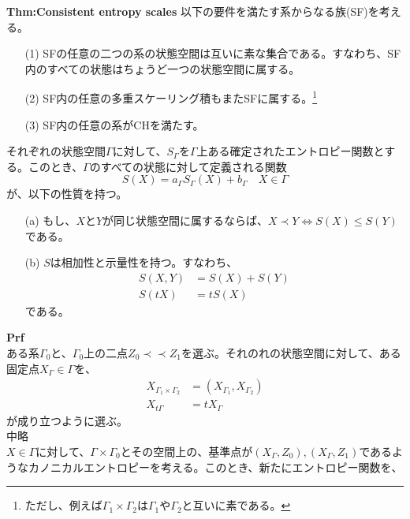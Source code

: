 \documentclass[a4paper,11pt]{jsarticle}
\numberwithin{equation}{section}
\begin{document}
\begin{itembox}[l]{\textbf{Thm:Consistent entropy scales}}
以下の要件を満たす系からなる族(SF)を考える。\\
\begin{itemize}
    \item[(1)] SFの任意の二つの系の状態空間は互いに素な集合である。すなわち、SF内のすべての状態はちょうど一つの状態空間に属する。\\
    \item[(2)] SF内の任意の多重スケーリング積もまたSFに属する。\footnote{ただし、例えば$\Gamma_1 \times \Gamma_2$は$\Gamma_1$や$\Gamma_2$と互いに素である。}\\
    \item[(3)] SF内の任意の系がCHを満たす。\\
\end{itemize}
それぞれの状態空間$\Gamma$に対して、$S_{\Gamma}$を$\Gamma$上ある確定されたエントロピー関数とする。このとき、$\Gamma$のすべての状態に対して定義される関数
\begin{equation}
    S(X) = a_{\Gamma}S_{\Gamma}(X)+b_{\Gamma} \quad X \in \Gamma
\end{equation}
が、以下の性質を持つ。\\
\begin{itemize}
    \item[(a)] もし、$X$と$Y$が同じ状態空間に属するならば、$X \prec Y \Leftrightarrow S(X) \leq S(Y)$である。\\
    \item[(b)] $S$は相加性と示量性を持つ。すなわち、
    \begin{align}
        S(X,Y) &= S(X)+S(Y)\\
        S(tX) &= tS(X)
    \end{align}
    である。\\
\end{itemize}
\end{itembox}
\textbf{Prf}\\
ある系$\Gamma_0$と、$\Gamma_0$上の二点$Z_0 \prec \prec Z_1$を選ぶ。それのれの状態空間に対して、ある固定点$X_{\Gamma}\in \Gamma$を、
\begin{align}
    X_{\Gamma_1 \times \Gamma_2} &= (X_{\Gamma_1},X_{\Gamma_2})\\
    X_{t\Gamma} &= tX_{\Gamma}
\end{align}
が成り立つように選ぶ。\\
中略\\
$X \in \Gamma$に対して、$\Gamma \times \Gamma_0$とその空間上の、基準点が$(X_{\Gamma},Z_0),(X_{\Gamma},Z_1)$であるようなカノニカルエントロピーを考える。このとき、新たにエントロピー関数を、
\end{document}
